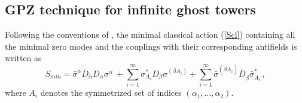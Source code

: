 \documentclass[a4paper,12pt]{article}
\begin{document}


\subsection{GPZ technique for infinite ghost towers}
\label{GPZ}

Following the conventions of \cite{GPZ}, the minimal classical action
(\ref{Scl}) containing all the minimal zero modes and the couplings
with their corresponding antifields is written as
\begin{equation}
S_{min}= \bar
\sigma^{\dot \alpha}\bar D_{\dot \alpha} D_\alpha\sigma^\alpha\  + 
\sum^{\infty}_{i=1}\sigma_{A_i}^* D_\beta \sigma^{(\beta A_i)} +  
\sum^{\infty}_{i= 1} \bar\sigma^{(\dot \beta \dot A_i)}  \bar D_{\dot
  \beta} \bar\sigma_{\dot A_i}^* 
\, , \label{min}
\end{equation}
where $A_i$ denotes the symmetrized set of indices $(\alpha_1,
\dots,\alpha_2)$.  
\end{document}
